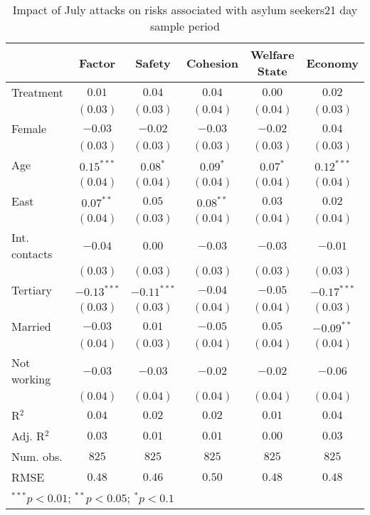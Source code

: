 
\begin{table}
\caption{Impact of July attacks on risks associated with asylum seekers21 day sample period}
\begin{center}
\begin{tabular}{l c c c c c}
\toprule
 & Factor & Safety & Cohesion & Welfare State & Economy \\
\midrule
Treatment     & $0.01$        & $0.04$        & $0.04$      & $0.00$     & $0.02$        \\
              & $(0.03)$      & $(0.03)$      & $(0.04)$    & $(0.04)$   & $(0.03)$      \\
Female        & $-0.03$       & $-0.02$       & $-0.03$     & $-0.02$    & $0.04$        \\
              & $(0.03)$      & $(0.03)$      & $(0.03)$    & $(0.03)$   & $(0.03)$      \\
Age           & $0.15^{***}$  & $0.08^{*}$    & $0.09^{*}$  & $0.07^{*}$ & $0.12^{***}$  \\
              & $(0.04)$      & $(0.04)$      & $(0.04)$    & $(0.04)$   & $(0.04)$      \\
East          & $0.07^{**}$   & $0.05$        & $0.08^{**}$ & $0.03$     & $0.02$        \\
              & $(0.04)$      & $(0.03)$      & $(0.04)$    & $(0.04)$   & $(0.04)$      \\
Int. contacts & $-0.04$       & $0.00$        & $-0.03$     & $-0.03$    & $-0.01$       \\
              & $(0.03)$      & $(0.03)$      & $(0.03)$    & $(0.03)$   & $(0.03)$      \\
Tertiary      & $-0.13^{***}$ & $-0.11^{***}$ & $-0.04$     & $-0.05$    & $-0.17^{***}$ \\
              & $(0.03)$      & $(0.03)$      & $(0.04)$    & $(0.04)$   & $(0.03)$      \\
Married       & $-0.03$       & $0.01$        & $-0.05$     & $0.05$     & $-0.09^{**}$  \\
              & $(0.04)$      & $(0.03)$      & $(0.04)$    & $(0.04)$   & $(0.04)$      \\
Not working   & $-0.03$       & $-0.03$       & $-0.02$     & $-0.02$    & $-0.06$       \\
              & $(0.04)$      & $(0.04)$      & $(0.04)$    & $(0.04)$   & $(0.04)$      \\
\midrule
R$^2$         & $0.04$        & $0.02$        & $0.02$      & $0.01$     & $0.04$        \\
Adj. R$^2$    & $0.03$        & $0.01$        & $0.01$      & $0.00$     & $0.03$        \\
Num. obs.     & $825$         & $825$         & $825$       & $825$      & $825$         \\
RMSE          & $0.48$        & $0.46$        & $0.50$      & $0.48$     & $0.48$        \\
\bottomrule
\multicolumn{6}{l}{\scriptsize{$^{***}p<0.01$; $^{**}p<0.05$; $^{*}p<0.1$}}
\end{tabular}
\label{tab_risk_21}
\end{center}
\end{table}
